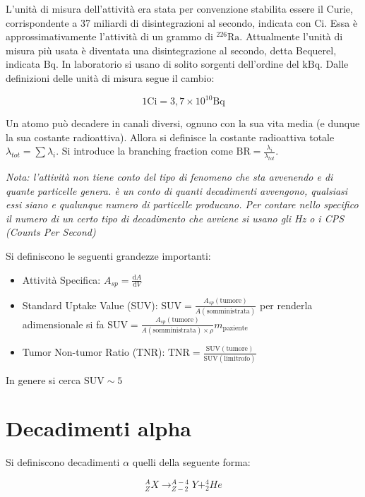 L'unità di misura dell'attività era stata per convenzione stabilita essere il Curie, corrispondente a 37 miliardi di disintegrazioni al secondo, indicata con $\text{Ci}$. Essa è approssimativamente l'attività di un grammo di $^{226}\text{Ra}$.
Attualmente l'unità di misura più usata è diventata una disintegrazione al secondo, detta Bequerel, indicata $\text{Bq}$.
In laboratorio si usano di solito sorgenti dell'ordine del $\text{kBq}$. Dalle definizioni delle unità di misura segue il cambio:

\begin{equation}
1 \text{Ci} = 3,7 \times 10^{10} \text{Bq}
\end{equation}

Un atomo può decadere in canali diversi, ognuno con la sua vita media (e dunque la sua costante radioattiva). Allora si definisce la costante radioattiva totale $\lambda_{tot}=\sum \lambda_{i}$. Si introduce la branching fraction come $\text{BR}=\frac{\lambda_i}{\lambda_{tot}}$.

\emph{Nota: l'attività non tiene conto del tipo di fenomeno che sta avvenendo e di quante particelle genera. è un conto di quanti decadimenti avvengono, qualsiasi essi siano e qualunque numero di particelle producano. Per contare nello specifico il numero di un certo tipo di decadimento che avviene si usano gli Hz o i CPS (Counts Per Second)}

Si definiscono le seguenti grandezze importanti:
\begin{itemize}
\item Attività Specifica: $A_{sp}=\frac{\mathrm{d}A}{\mathrm{d}V}$
\item Standard Uptake Value (SUV): $\text{SUV}=\frac{A_{sp}(\text{tumore})}{A(\text{somministrata})}$ per renderla adimensionale si fa $\text{SUV}=\frac{A_{sp}(\text{tumore})}{A(\text{somministrata})\times \rho}m_{\text{paziente}}$
\item Tumor Non-tumor Ratio (TNR): $\text{TNR}=\frac{\text{SUV}(\text{tumore})}{\text{SUV}(\text{limitrofo})}$
\end{itemize}

In genere si cerca $\text{SUV}\sim5$

\section{Decadimenti alpha}

Si definiscono decadimenti $\alpha$ quelli della seguente forma:

\begin{equation}
^A_Z X \longrightarrow ^{A-4}_{Z-2}Y + ^4_2He
\end{equation}

